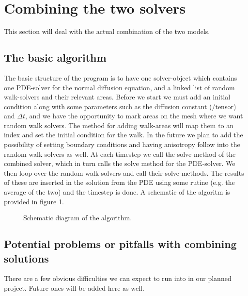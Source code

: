 \section{Combining the two solvers}\label{combining_the_solvers}
This section will deal with the actual combination of the two models.\\

\subsection{The basic algorithm}\label{basic_algorithm}

The basic structure of the program is to have one solver-object which contains one PDE-solver for the normal diffusion equation, and a linked list of random walk-solvers and their relevant areas. 
Before we start we must add an initial condition along with some parameters such as the diffusion constant (/tensor) and $\Delta t$, and we have the opportunity to mark areas on the mesh where we want random walk solvers. 
The method for adding walk-areas will map them to an index and set the initial condition for the walk. 
In the future we plan to add the possibility of setting boundary conditions and having anisotropy follow into the random walk solvers as well.
At each timestep we call the solve-method of the combined solver, which in turn calls the solve method for the PDE-solver. 
We then loop over the random walk solvers and call their solve-methods. 
The results of these are inserted in the solution from the PDE using some rutine (e.g. the average of the two) and the timestep is done. 
A schematic of the algoritm is provided in figure \ref{schematic}.

\begin{figure}[H]
\centering
\caption[Algorithm]{Schematic diagram of the algorithm.}
\label{schematic}
\end{figure}

\subsection{Potential problems or pitfalls with combining solutions}\label{problems_and_pitfalls}

There are a few obvious difficulties we can expect to run into in our planned project. 
Future ones will be added here as well.

